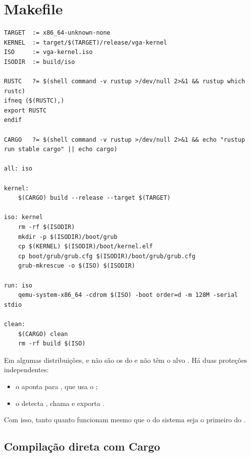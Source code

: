\section{Makefile}

\begin{lstlisting}[caption={Alvos principais do \code{Makefile}.},label={lst:makefile}]
TARGET  := x86_64-unknown-none
KERNEL  := target/$(TARGET)/release/vga-kernel
ISO     := vga-kernel.iso
ISODIR  := build/iso

RUSTC   ?= $(shell command -v rustup >/dev/null 2>&1 && rustup which rustc)
ifneq ($(RUSTC),)
export RUSTC
endif

CARGO   ?= $(shell command -v rustup >/dev/null 2>&1 && echo "rustup run stable cargo" || echo cargo)

all: iso

kernel:
	$(CARGO) build --release --target $(TARGET)

iso: kernel
	rm -rf $(ISODIR)
	mkdir -p $(ISODIR)/boot/grub
	cp $(KERNEL) $(ISODIR)/boot/kernel.elf
	cp boot/grub/grub.cfg $(ISODIR)/boot/grub/grub.cfg
	grub-mkrescue -o $(ISO) $(ISODIR)

run: iso
	qemu-system-x86_64 -cdrom $(ISO) -boot order=d -m 128M -serial stdio

clean:
	$(CARGO) clean
	rm -rf build $(ISO)
\end{lstlisting}

\begin{nota}
Em algumas distribui\c{c}\~oes,  e 
n\~ao s\~ao os do  e n\~ao t\^em o alvo
. H\'a duas prote\c{c}\~oes independentes:

\begin{itemize}
  \item o  aponta  para
        , que usa o ;
  \item o  detecta , chama
         e exporta .
\end{itemize}

Com isso, tanto  quanto  funcionam mesmo que o
 do sistema seja o primeiro do .
\end{nota}

\subsection{Compila\c{c}\~ao direta com Cargo}

